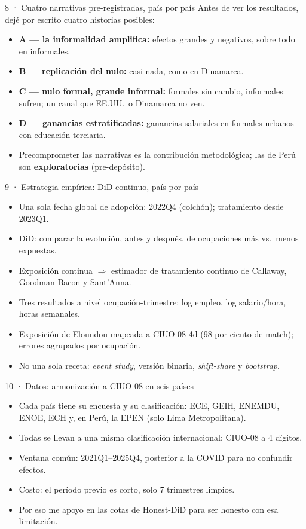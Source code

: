 \documentclass[11pt,aspectratio=169]{beamer}
\begin{document}
\begin{frame}{8 · Cuatro narrativas pre-registradas, país por país}
Antes de ver los resultados, dejé por escrito cuatro historias posibles:
\begin{itemize}
  \item \textbf{A — la informalidad amplifica:} efectos grandes y negativos, sobre todo en informales.
  \item \textbf{B — replicación del nulo:} casi nada, como en Dinamarca.
  \item \textbf{C — nulo formal, grande informal:} formales sin cambio, informales sufren; un canal que EE.UU.\ o Dinamarca no ven.
  \item \textbf{D — ganancias estratificadas:} ganancias salariales en formales urbanos con educación terciaria.
  \item Precomprometer las narrativas es la contribución metodológica; las de Perú son \textbf{exploratorias} (pre-depósito).
\end{itemize}
\end{frame}

\begin{frame}{9 · Estrategia empírica: DiD continuo, país por país}
\begin{itemize}
  \item Una sola fecha global de adopción: 2022Q4 (colchón); tratamiento desde 2023Q1.
  \item DiD: comparar la evolución, antes y después, de ocupaciones más vs.\ menos expuestas.
  \item Exposición continua $\Rightarrow$ estimador de tratamiento continuo de Callaway, Goodman-Bacon y Sant'Anna.
  \item Tres resultados a nivel ocupación-trimestre: log empleo, log salario/hora, horas semanales.
  \item Exposición de Eloundou mapeada a CIUO-08 4d (98 por ciento de match); errores agrupados por ocupación.
  \item No una sola receta: \emph{event study}, versión binaria, \emph{shift-share} y \emph{bootstrap}.
\end{itemize}
\end{frame}

\begin{frame}{10 · Datos: armonización a CIUO-08 en seis países}
\begin{itemize}
  \item Cada país tiene su encuesta y su clasificación: ECE, GEIH, ENEMDU, ENOE, ECH y, en Perú, la EPEN (solo Lima Metropolitana).
  \item Todas se llevan a una misma clasificación internacional: CIUO-08 a 4 dígitos.
  \item Ventana común: 2021Q1--2025Q4, posterior a la COVID para no confundir efectos.
  \item Costo: el período previo es corto, solo 7 trimestres limpios.
  \item Por eso me apoyo en las cotas de Honest-DiD para ser honesto con esa limitación.
\end{itemize}
\end{frame}
\end{document}
